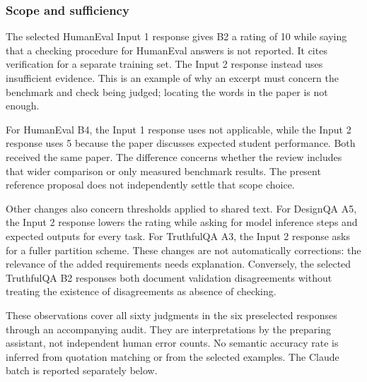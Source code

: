 \subsubsection{Scope and sufficiency}
The selected HumanEval Input 1 response gives B2 a rating of 10 while saying that a checking procedure for HumanEval answers is not reported. It cites verification for a separate training set. The Input 2 response instead uses insufficient evidence. This is an example of why an excerpt must concern the benchmark and check being judged; locating the words in the paper is not enough.

For HumanEval B4, the Input 1 response uses not applicable, while the Input 2 response uses 5 because the paper discusses expected student performance. Both received the same paper. The difference concerns whether the review includes that wider comparison or only measured benchmark results. The present reference proposal does not independently settle that scope choice.

Other changes also concern thresholds applied to shared text. For DesignQA A5, the Input 2 response lowers the rating while asking for model inference steps and expected outputs for every task. For TruthfulQA A3, the Input 2 response asks for a fuller partition scheme. These changes are not automatically corrections: the relevance of the added requirements needs explanation. Conversely, the selected TruthfulQA B2 responses both document validation disagreements without treating the existence of disagreements as absence of checking.

These observations cover all sixty judgments in the six preselected responses through an accompanying audit. They are interpretations by the preparing assistant, not independent human error counts. No semantic accuracy rate is inferred from quotation matching or from the selected examples. The Claude batch is reported separately below.
